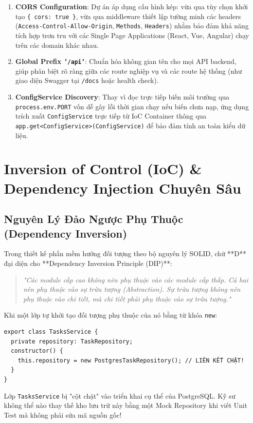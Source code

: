 \documentclass[12pt,a4paper,oneside]{book}
\begin{document}
\begin{infobox}
  \begin{enumerate}
    \item \textbf{CORS Configuration}: Dự án áp dụng cấu hình kép: vừa qua tùy chọn khởi tạo \texttt{\{ cors: true \}}, vừa qua middleware thiết lập tường minh các headers (\texttt{Access-Control-Allow-Origin}, \texttt{Methods}, \texttt{Headers}) nhằm bảo đảm khả năng tích hợp trơn tru với các Single Page Applications (React, Vue, Angular) chạy trên các domain khác nhau.
    \item \textbf{Global Prefix \texttt{'/api'}}: Chuẩn hóa không gian tên cho mọi API backend, giúp phân biệt rõ ràng giữa các route nghiệp vụ và các route hệ thống (như giao diện Swagger tại \texttt{/docs} hoặc health check).
    \item \textbf{ConfigService Discovery}: Thay vì đọc trực tiếp biến môi trường qua \texttt{process.env.PORT} vốn dễ gây lỗi thời gian chạy nếu biến chưa nạp, ứng dụng trích xuất \texttt{ConfigService} trực tiếp từ IoC Container thông qua \texttt{app.get<ConfigService>(ConfigService)} để bảo đảm tính an toàn kiểu dữ liệu.
  \end{enumerate}
\end{infobox}

\chapter{Inversion of Control (IoC) \& Dependency Injection Chuyên Sâu}

\section{Nguyên Lý Đảo Ngược Phụ Thuộc (Dependency Inversion)}
Trong thiết kế phần mềm hướng đối tượng theo bộ nguyên lý SOLID, chữ **D** đại diện cho **Dependency Inversion Principle (DIP)**:
\begin{quote}
  \textit{"Các module cấp cao không nên phụ thuộc vào các module cấp thấp. Cả hai nên phụ thuộc vào sự trừu tượng (Abstraction). Sự trừu tượng không nên phụ thuộc vào chi tiết, mà chi tiết phải phụ thuộc vào sự trừu tượng."}
\end{quote}

Khi một lớp tự khởi tạo đối tượng phụ thuộc của nó bằng từ khóa \texttt{new}:
\begin{codebox}
\begin{Verbatim}[fontsize=\small]
export class TasksService {
  private repository: TaskRepository;
  constructor() {
    this.repository = new PostgresTaskRepository(); // LIÊN KẾT CHẶT!
  }
}
\end{Verbatim}
\end{codebox}
Lớp \texttt{TasksService} bị "cột chặt" vào triển khai cụ thể của PostgreSQL. Kỹ sư không thể nào thay thế kho lưu trữ này bằng một Mock Repository khi viết Unit Test mà không phải sửa mã nguồn gốc!
\end{document}
